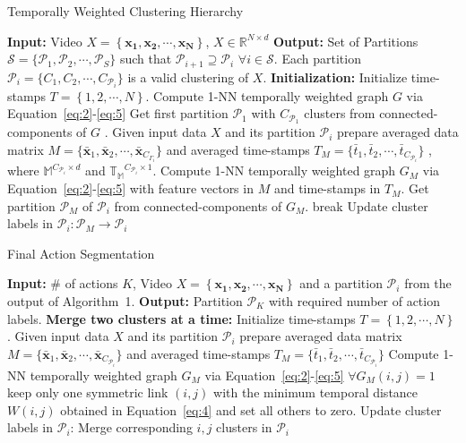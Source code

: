 \documentclass[10pt,twocolumn,letterpaper]{article}
\begin{document}
\begin{algorithm}[t]
\caption{Temporally Weighted Clustering Hierarchy}\label{algo:the_alg}
\begin{algorithmic}[1]
\STATE \textbf{Input:} Video $X=\left \{\mathbf{x_1}, \mathbf{x_2}, \cdots, \mathbf{x_N}\right \}$, $X \in \mathbb{R}^{ N \times d}$ \STATE \textbf{Output:} Set of Partitions $\mathbf{\mathcal{S}}=\{\mathcal{P}_1,\mathcal{P}_2,\cdots,\mathcal{P}_S\}$ such that $\mathcal{P}_{i+1}\supseteq\mathcal{P}_i$ $\forall i\in \mathcal{S}$. Each partition $\mathcal{P}_i=\{C_1,C_2,\cdots,C_{\mathcal{P}_i}\}$ is a valid clustering of $X$. \STATE \textbf{Initialization:}
\STATE Initialize time-stamps $T=\left \{1, 2,\cdots, N\right \}$. Compute 1-NN temporally weighted graph $G$  via Equation~\ref{eq:2}-\ref{eq:5} \label{algo:line4}
\STATE  Get first partition $\mathcal{P}_1$ with $C_{\mathcal{P}_1}$ clusters from connected-components of $G$  . \label{algo:line5}
\STATE  Given input data $X$ and its partition $\mathcal{P}_i$ prepare averaged data matrix $M=\{\bar{\mathbf{x}}_1, \bar{\mathbf{x}}_2,\cdots,\bar{\mathbf{x}}_{C_{\Gamma_i}}\}$ and averaged time-stamps $T_M=\{\bar{t}_1,\bar{t}_2,\cdots, \bar{t}_{C_{\mathcal{P}_i}}\}$ , where   $\mathbb{M}^{ C_{\mathcal{P}_i} \times d}$ and $\mathbb{T_M}^{ C_{\mathcal{P}_i} \times 1}$. 
\STATE Compute 1-NN temporally weighted graph $G_M$  via Equation~\ref{eq:2}-\ref{eq:5} with feature vectors in $M$ and time-stamps in $T_M$.
\STATE Get partition $\mathcal{P}_M$ of $\mathcal{P}_i$ from connected-components of $G_M$.
\STATE break
\ELSE
\STATE Update cluster labels in $\mathcal{P}_i:\mathcal{P}_M\to\mathcal{P}_i$
\ENDIF 
\ENDWHILE
\end{algorithmic}
\end{algorithm}



\begin{algorithm}[t]
\caption{Final Action Segmentation}\label{algo:the_alg2} 
\begin{algorithmic}[1]
\STATE \textbf{Input:} \# of actions $K$, Video $X=\left \{\mathbf{x_1}, \mathbf{x_2}, \cdots, \mathbf{x_N}\right \}$ and a partition $\mathcal{P}_i$ from the output of Algorithm~1.
\STATE \textbf{Output:} Partition $\mathcal{P}_K$ with required number of action labels.
\STATE \textbf{Merge two clusters at a time:}
\STATE  Initialize time-stamps $T=\left \{1, 2,\cdots, N\right \}$. Given input data $X$ and its partition $\mathcal{P}_i$ prepare averaged data matrix $M=\{\bar{\mathbf{x}}_1, \bar{\mathbf{x}}_2,\cdots,\bar{\mathbf{x}}_{C_{\mathcal{P}_i}}\}$ and averaged time-stamps $T_M=\{\bar{t}_1,\bar{t}_2,\cdots, \bar{t}_{C_{\mathcal{P}_i}}\}$
\STATE Compute 1-NN temporally weighted graph $G_M$  via Equation~\ref{eq:2}-\ref{eq:5}
\STATE  $\forall G_M(i,j)=1$ keep only one symmetric link $(i,j)$ with the minimum temporal distance $W(i,j)$ obtained in Equation~\ref{eq:4} and set all others to zero. 
\STATE  Update cluster labels in $\mathcal{P}_i$: Merge corresponding $i,j$ clusters in $\mathcal{P}_i$
\ENDFOR
\end{algorithmic}

\end{algorithm}
\end{document}
